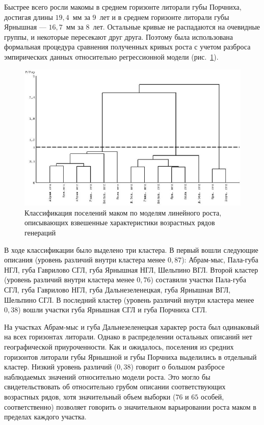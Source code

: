 Быстрее   всего   росли   макомы   в   среднем   горизонте   литорали   губы Порчниха, достигая длины $19,4$~мм за $9$~лет и в среднем горизонте литорали губы Ярнышная --- $16,7$~мм за $8$~лет. 
Остальные кривые не распадаются на очевидные группы, и некоторые пересекают   друг   друга.   
Поэтому   была   использована   формальная   процедура   сравнения полученных   кривых   роста   с   учетом   разброса   эмпирических   данных   относительно регрессионной модели (рис.~\ref{ris:dendrogramma_linear_all_gorizonts}).
    \begin{figure}[p]
        \includegraphics[width=\textwidth]{../Barenc_Sea/growth_from_MSc/dendrogramma_sravnenie_rosta_linear_all_gorizonts.jpg}
    \caption{Классификация поселений маком по моделям линейного роста, описывающих взвешенные характеристики возрастных рядов генераций}
    \label{ris:dendrogramma_linear_all_gorizonts}
    \end{figure}

В   ходе   классификации   было   выделено   три   кластера.   
В   первый   вошли   следующие описания (уровень различий внутри кластера менее $0,87$): Абрам-мыс, Пала-губа НГЛ, губа Гаврилово   СГЛ,   губа   Ярнышная   НГЛ,   Шельпино   ВГЛ.   
Второй   кластер   (уровень   различий внутри кластера менее $0,76$) составили участки Пала-губа СГЛ, губа Гаврилово НГЛ, губа Дальнезеленецкая,   губа   Ярнышная   ВГЛ,   Шельпино   СГЛ.   
В   последний   кластер   (уровень различий внутри кластера менее $0,38$) вошли участки губа Ярнышная СГЛ и губа Порчниха СГЛ. 

На участках Абрам-мыс и губа Дальнезеленецкая характер роста был одинаковый на всех горизонтах литорали. 
Однако в распределении остальных описаний нет географической приуроченности. 
Как и ожидалось, поселения  из средних горизонтов литорали губы Ярнышной и губы Порчниха   выделились   в   отдельный   кластер.   
Низкий   уровень   различий   ($0,38$)   говорит   о большом   разбросе   наблюдаемых   значений   относительно   модели   роста.   
Это   могло   бы свидетельствовать   об   относительно   грубом   описании   соответствующих   возрастных   рядов, хотя   значительный объем  выборки ($76$  и $65$  особей, соответственно)  позволяет  говорить  о значительном варьировании роста маком в пределах каждого участка.

